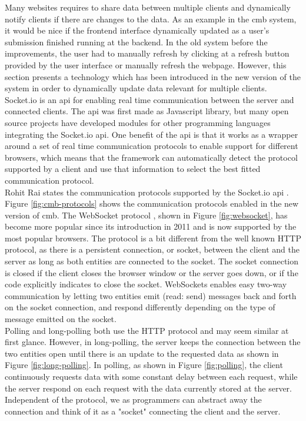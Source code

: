 Many websites requires to share data between multiple clients and dynamically notify clients if there are changes to the data. As an example in the \gls{cmb} system, it would be nice if the frontend interface dynamically updated as a user's submission finished running at the backend. In the old system before the improvements, the user had to manually refresh by clicking at a refresh button provided by the user interface or manually refresh the webpage. However, this section presents a technology which has been introduced in the new version of the system in order to dynamically update data relevant for multiple clients. \\

Socket.io \cite{SOCKETIO} is an \gls{api} for enabling real time communication between the server and connected clients. The \gls{api} was first made as Javascript library, but many open source projects have developed modules for other programming languages integrating the Socket.io \gls{api}. One benefit of the \gls{api} is that it works as a wrapper around a set of real time communication protocols to enable support for different browsers, which means that the framework can automatically detect the protocol supported by a client and use that information to select the best fitted communication protocol. \\

Rohit Rai states the communication protocols supported by the Socket.io \gls{api} \cite{Rai2013}. Figure \ref{fig:cmb-protocols} shows the communication protocols enabled in the new version of \gls{cmb}. The WebSocket protocol \cite{a:Fette2011}, shown in Figure \ref{fig:websocket}, has become more popular since its introduction in 2011 and is now supported by the most popular browsers. The protocol is a bit different from the well known HTTP protocol, as there is a persistent connection, or socket, between the client and the server as long as both entities are connected to the socket. The socket connection is closed if the client closes the browser window or the server goes down, or if the code explicitly indicates to close the socket. WebSockets enables easy two-way communication by letting two entities emit (read: send) messages back and forth on the socket connection, and respond differently depending on the type of message emitted on the socket. \\

Polling and long-polling both use the HTTP protocol and may seem similar at first glance. However, in long-polling, the server keeps the connection between the two entities open until there is an update to the requested data as shown in Figure \ref{fig:long-polling}. In polling, as shown in Figure \ref{fig:polling}, the client continuously requests data with some constant delay between each request, while the server respond on each request with the data currently stored at the server. Independent of the protocol, we as programmers can abstract away the connection and think of it as a "socket" connecting the client and the server. \\

